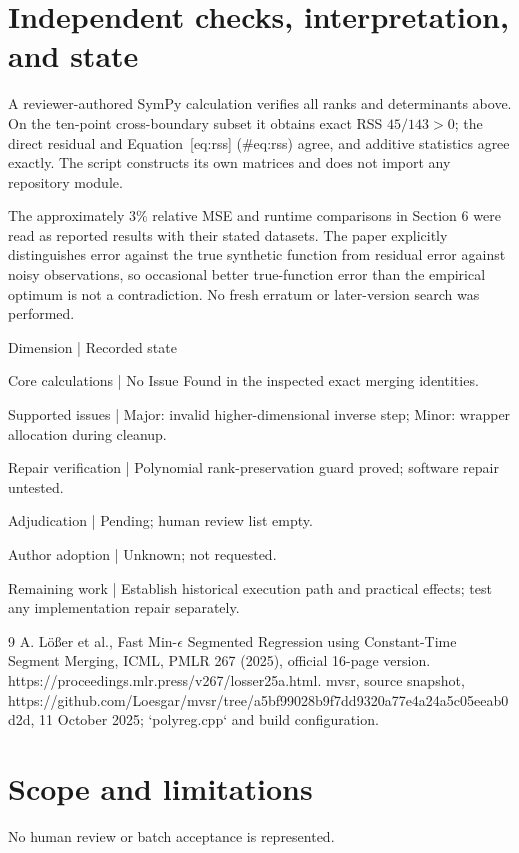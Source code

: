 \documentclass[10pt]{article}
\begin{document}
\section*{Independent checks, interpretation, and state}
A reviewer-authored SymPy calculation verifies all ranks and determinants above. On the ten-point cross-boundary subset it obtains exact RSS \(45/143>0\); the direct residual and Equation [eq:rss] (\#eq:rss) agree, and additive statistics agree exactly. The script constructs its own matrices and does not import any repository module.\par
The approximately 3\% relative MSE and runtime comparisons in Section 6 were read as reported results with their stated datasets. The paper explicitly distinguishes error against the true synthetic function from residual error against noisy observations, so occasional better true-function error than the empirical optimum is not a contradiction. No fresh erratum or later-version search was performed.\par
Dimension | Recorded state\par
Core calculations | No Issue Found in the inspected exact merging identities.\par
Supported issues | Major: invalid higher-dimensional inverse step; Minor: wrapper allocation during cleanup.\par
Repair verification | Polynomial rank-preservation guard proved; software repair untested.\par
Adjudication | Pending; human review list empty.\par
Author adoption | Unknown; not requested.\par
Remaining work | Establish historical execution path and practical effects; test any implementation repair separately.\par
9 A. Lößer et al., Fast Min-\(\epsilon\) Segmented Regression using Constant-Time Segment Merging, ICML, PMLR 267 (2025), official 16-page version. https://proceedings.mlr.press/v267/losser25a.html. mvsr, source snapshot, https://github.com/Loesgar/mvsr/tree/a5bf99028b9f7dd9320a77e4a24a5c05eeab0d2d, 11 October 2025; `polyreg.cpp` and build configuration.\par
\section*{Scope and limitations}
No human review or batch acceptance is represented.\par
\end{document}
